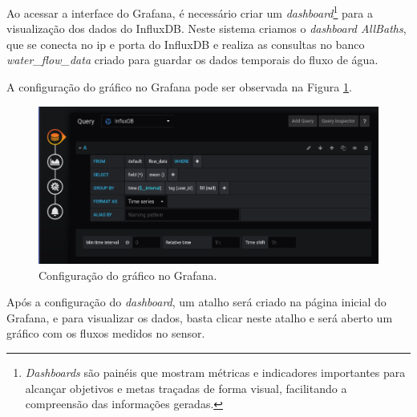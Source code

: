 \newpage

Ao acessar a interface do Grafana, é necessário criar um \textit{dashboard}\footnote{\textit{Dashboards} são painéis que mostram métricas e indicadores importantes para alcançar objetivos e metas traçadas de forma visual, facilitando a compreensão das informações geradas.} para a visualização dos dados do InfluxDB. Neste sistema criamos o \textit{dashboard AllBaths}, que se conecta no ip e porta do InfluxDB e realiza as consultas no banco \textit{water\_flow\_data} criado para guardar os dados temporais do fluxo de água.

A configuração do gráfico no Grafana pode ser observada na Figura \ref{fig:grafanaconf}.

\begin{figure}[htbp]
	\centering
	\includegraphics[width=1\linewidth]{figuras/grafanaconf.png}
	\caption{Configuração do gráfico no Grafana.}
	\label{fig:grafanaconf}
\end{figure}

Após a configuração do \textit{dashboard}, um atalho será criado na página inicial do Grafana, e para visualizar os dados, basta clicar neste atalho e será aberto um gráfico com os fluxos medidos no sensor.

